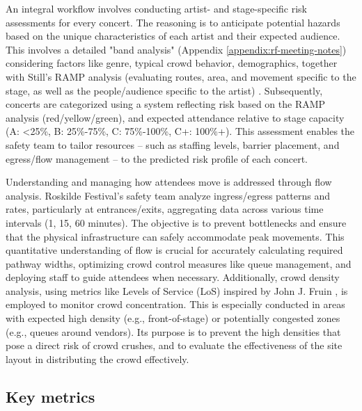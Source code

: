 An integral workflow involves conducting artist- and stage-specific risk assessments for every concert. The reasoning is to anticipate potential hazards based on the unique characteristics of each artist and their expected audience. This involves a detailed "band analysis" (Appendix \ref{appendix:rf-meeting-notes}) considering factors like genre, typical crowd behavior, demographics, together with Still's RAMP analysis (evaluating routes, area, and movement specific to the stage, as well as the people/audience specific to the artist) \cite{ramp}. Subsequently, concerts are categorized using a system reflecting risk based on the RAMP analysis (red/yellow/green), and expected attendance relative to stage capacity (A: <25\%, B: 25\%-75\%, C: 75\%-100\%, C+: 100\%+). This assessment enables the safety team to tailor resources -- such as staffing levels, barrier placement, and egress/flow management -- to the predicted risk profile of each concert.

Understanding and managing how attendees move is addressed through flow analysis. Roskilde Festival's safety team analyze ingress/egress patterns and rates, particularly at entrances/exits, aggregating data across various time intervals (1, 15, 60 minutes). The objective is to prevent bottlenecks and ensure that the physical infrastructure can safely accommodate peak movements. This quantitative understanding of flow is crucial for accurately calculating required pathway widths, optimizing crowd control measures like queue management, and deploying staff to guide attendees when necessary. Additionally, crowd density analysis, using metrics like Levels of Service (LoS) inspired by John J. Fruin \cite{fruin}, is employed to monitor crowd concentration. This is especially conducted in areas with expected high density (e.g., front-of-stage) or potentially congested zones (e.g., queues around vendors). Its purpose is to prevent the high densities that pose a direct risk of crowd crushes, and to evaluate the effectiveness of the site layout in distributing the crowd effectively.

\subsection{Key metrics}
\label{sec:key-metrics}

